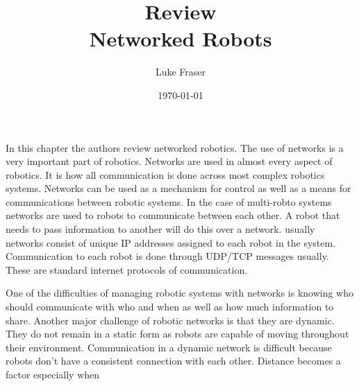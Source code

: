 \documentclass{article}
\begin{document}
\title{{\large Review} \\ Networked Robots}
\author{Luke Fraser}
\date{\today}
\maketitle

\begingroup
\renewcommand{\section}[2]{}


\endgroup

\section*{Summary}
In this chapter the authors review networked robotics. The use of networks is a very important part of robotics. Networks are used in almost every aspect of robotics. It is how all communication is done across most complex robotics systems. Networks can be used as a mechanism for control as well as a means for communications between robotic systems. In the case of multi-robto systems networks are used to robots to communicate between each other. A robot that needs to pass information to another will do this over a network. usually networks consist of unique IP addresses assigned to each robot in the system. Communication to each robot is done through UDP/TCP messages usually. These are standard internet protocols of communication.

One of the difficulties of managing robotic systems with networks is knowing who should communicate with who and when as well as how much information to share. Another major challenge of robotic networks is that they are dynamic. They do not remain in a static form as robots are capable of moving throughout their environment. Communication in a dynamic network is difficult because robots don't have a consistent connection with each other. Distance becomes a factor especially when
\section*{Strengths}

\section*{Critique}

\cite{ref}
\end{document}
